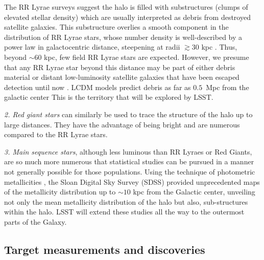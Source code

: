 The RR Lyrae surveys suggest the halo is filled with substructures
(clumps of elevated stellar density) which are usually interpreted as
debris from destroyed satellite galaxies. This substructure overlies a
smooth component in the distribution of RR Lyrae stars, whose number density is well-described by a power law in galactocentric distance,
steepening at radii $\gtrsim 30$ kpc \citep{zinn14}.  Thus, beyond
$\sim 60$ kpc, few field RR Lyrae stars are expected. However, we
presume that any RR Lyrae star beyond this distance may be part of
either debris material or distant low-luminosity satellite galaxies
that have been escaped detection until now \citep{sesar14,baker15}.
LCDM models predict debris as far as $0.5$~Mpc from the galactic
center This is the territory that will be explored by LSST.

{\it 2. Red giant stars} can similarly be used to trace the structure
of the halo up to large distances. They have the advantage of being
bright and are numerous compared to the RR Lyrae stars.

{\it 3. Main sequence stars}, although less luminous than RR Lyraes or
Red Giants, are so much more numerous that statistical studies can be
pursued in a manner not generally possible for those populations.
Using the technique of photometric metallicities \citep{ivezic08}, the
Sloan Digital Sky Survey (SDSS) provided unprecedented maps of the
metallicity distribution up to $\sim 10$ kpc from the Galactic center,
unveiling not only the mean metallicity distribution of the halo but
also, sub-structures within the halo. LSST will extend these studies
all the way to the outermost parts of the Galaxy.


\subsection{Target measurements and discoveries}
\label{sec:\secname:MW_Halo_targets}

